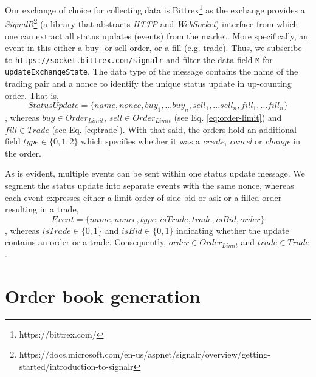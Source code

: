 Our exchange of choice for collecting data is Bittrex\footnote{https://bittrex.com/} as the exchange provides a \textit{SignalR}\footnote{https://docs.microsoft.com/en-us/aspnet/signalr/overview/getting-started/introduction-to-signalr} (a library that abstracts \textit{HTTP} and \textit{WebSocket}) interface from which one can extract all status updates (events) from the market.
More specifically, an event in this either a buy- or sell order, or a fill (e.g. trade).
Thus, we subscribe to \texttt{https://socket.bittrex.com/signalr} and filter the data field \texttt{M} for \texttt{updateExchangeState}.
The data type of the message contains the name of the trading pair and a nonce to identify the unique status update in up-counting order.
That is,
\begin{equation}
    StatusUpdate = \{name, nonce, buy_1,...buy_n, sell_1,...sell_n, fill_1,...fill_n\}
\end{equation}
, whereas $buy \in Order_{Limit}$, $sell \in Order_{Limit}$ (see Eq. \ref{eq:order-limit}) and $fill \in Trade$ (see Eq. \ref{eq:trade}).
With that said, the orders hold an additional field $type \in \{0,1,2\}$ which specifies whether it was a \textit{create}, \textit{cancel} or \textit{change} in the order.

As is evident, multiple events can be sent within one status update message. 
We segment the status update into separate events with the same nonce, whereas each event expresses either a limit order of side bid or ask or a filled order resulting in a trade,
\begin{equation}\label{eq:event-update}
    Event = \{name, nonce, type, isTrade, trade, isBid, order\}
\end{equation}
, whereas $isTrade \in \{0,1\}$ and $isBid \in \{0,1\}$ indicating whether the update contains an order or a trade. 
Consequently, $order \in Order_{Limit}$ and $trade \in Trade$.

\section{Order book generation}

